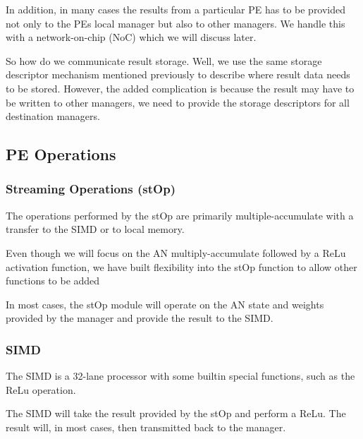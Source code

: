 \documentclass[journal]{IEEEtran}
\begin{document}
In addition, in many cases the results from a particular PE has to be provided not only to the PEs local manager but also to other managers. We handle this with a network-on-chip (NoC) which we will discuss later.

So how do we communicate result storage. Well, we use the same storage descriptor mechanism mentioned previously to describe where result data needs to be stored. However, the added complication is because the result may have to be written to other managers, we need to provide the storage descriptors for all destination managers.


\subsection{PE Operations}
\label{sec:PE Operations}

\subsubsection{Streaming Operations (stOp)}
\label{ssec:streamingOps}
The operations performed by the stOp are primarily multiple-accumulate with a transfer to the SIMD or to local memory.

Even though we will focus on the AN multiply-accumulate followed by a ReLu activation function, we have built flexibility into the stOp function to allow other functions to be added

In most cases, the stOp module will operate on the AN state and weights provided by the manager and provide the result to the SIMD.
\subsubsection{SIMD}
\label{ssec:SIMD}

The SIMD is a 32-lane processor with some builtin special functions, such as the ReLu operation.

The SIMD will take the result provided by the stOp and perform a ReLu. The result will, in most cases, then transmitted back to the manager.
\end{document}
